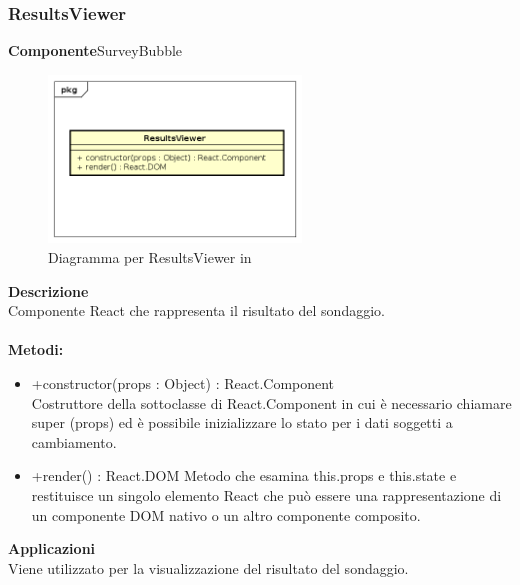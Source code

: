 \subsubsection{ResultsViewer}
\textbf{Componente}SurveyBubble\\
   \FloatBarrier
   \begin{figure}[ht]
   \centering
   \includegraphics[width=0.6\textwidth]{img/single-ResultsViewer}
   \caption{{Diagramma per ResultsViewer in }}
\end{figure}
\FloatBarrier
\textbf{Descrizione}\\
Componente React che rappresenta il risultato del sondaggio.
\\
\\
\textbf{Metodi:} 
\begin{itemize}
\item +constructor(props : Object) : React.Component 
\\
Costruttore della sottoclasse di React.Component in cui è necessario chiamare super (props) ed è possibile inizializzare lo stato per i dati soggetti a cambiamento.

\item +render() : React.DOM
Metodo che esamina this.props e this.state e restituisce un singolo elemento React che può essere una rappresentazione di un componente DOM nativo o un altro componente composito.

\end{itemize} 


\textbf{Applicazioni}\\
Viene utilizzato per la visualizzazione del risultato del sondaggio. 


\clearpage

